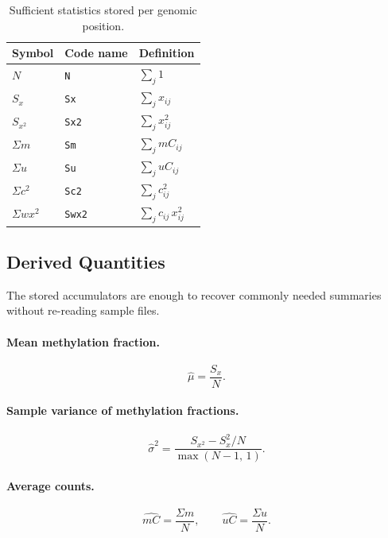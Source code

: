 \documentclass[11pt]{article}
\begin{document}
\begin{table}[h]
\centering
\begin{tabular}{@{}lll@{}}
\toprule
Symbol & Code name & Definition \\
\midrule
\(N\)      & \texttt{N}    & \(\displaystyle\sum_j 1\) \\[6pt]
\(S_x\)    & \texttt{Sx}   & \(\displaystyle\sum_j x_{ij}\) \\[6pt]
\(S_{x^2}\)& \texttt{Sx2}  & \(\displaystyle\sum_j x_{ij}^{2}\) \\[6pt]
\(\Sigma m\)& \texttt{Sm}  & \(\displaystyle\sum_j mC_{ij}\) \\[6pt]
\(\Sigma u\)& \texttt{Su}  & \(\displaystyle\sum_j uC_{ij}\) \\[6pt]
\(\Sigma c^2\)& \texttt{Sc2}& \(\displaystyle\sum_j c_{ij}^{2}\) \\[6pt]
\(\Sigma w x^2\)& \texttt{Swx2}& \(\displaystyle\sum_j c_{ij}\,x_{ij}^{2}\) \\[6pt]
\bottomrule
\end{tabular}
\caption{Sufficient statistics stored per genomic position.}
\label{tab:stats}
\end{table}

\subsection{Derived Quantities}

The stored accumulators are enough to recover commonly needed summaries
without re-reading sample files.

\paragraph{Mean methylation fraction.}
\begin{equation}
  \hat{\mu} = \frac{S_x}{N}.
\end{equation}

\paragraph{Sample variance of methylation fractions.}
\begin{equation}
  \hat{\sigma}^2 = \frac{S_{x^2} - S_x^2/N}{\max(N-1,\,1)}.
\end{equation}

\paragraph{Average counts.}
\begin{equation}
  \widehat{mC} = \frac{\Sigma m}{N}, \qquad
  \widehat{uC} = \frac{\Sigma u}{N}.
\end{equation}
\end{document}
